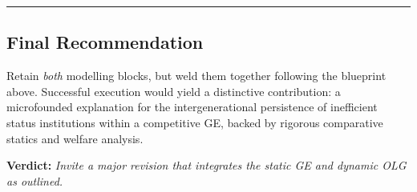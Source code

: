 \documentclass[12pt,letterpaper]{article}
\begin{document}
\bigskip
\hrule
\bigskip

\subsection{Final Recommendation}

Retain \emph{both} modelling blocks, but weld them together following the blueprint above.  
Successful execution would yield a distinctive contribution: a microfounded explanation for the intergenerational persistence of inefficient status institutions within a competitive GE, backed by rigorous comparative statics and welfare analysis.

\bigskip
\textbf{Verdict:} \emph{Invite a major revision that integrates the static GE and dynamic OLG as outlined.}

	
	
	 
	
\end{document}
